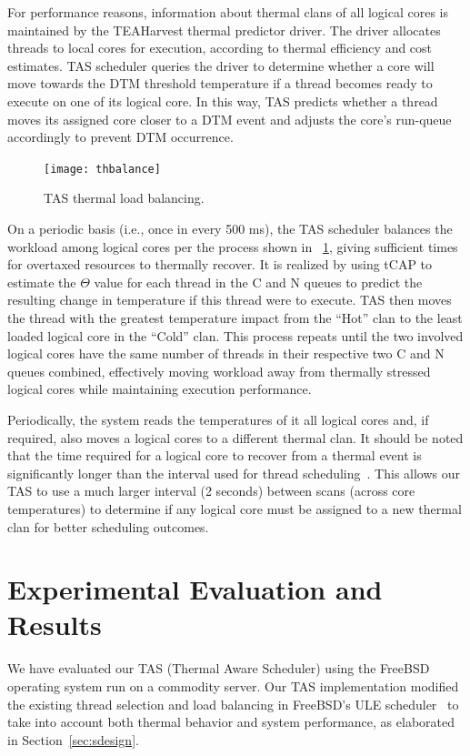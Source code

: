 \documentclass[times, 10pt,twocolumn]{IEEEtran}
\begin{document}
For performance reasons, information about thermal clans of all logical
cores is maintained by the TEAHarvest thermal predictor driver.  The
driver allocates threads to local cores for execution, according to
thermal efficiency and cost estimates.  TAS scheduler queries the driver
to determine whether a core will move towards the DTM threshold
temperature if a thread becomes ready to execute on one of its logical
core.  In this way, TAS predicts whether a thread moves its assigned
core closer to a DTM event and adjusts the core's run-queue accordingly
to prevent DTM occurrence.

\begin{figure}[t]
  \centering
  \texttt{[image: thbalance]}
  \caption{TAS thermal load balancing.}
  \label{fig:tasbalance}
\end{figure}
On a periodic basis (i.e., once in every 500 ms), the TAS scheduler
balances the workload among logical cores per the process shown in
\figurename~\ref{fig:tasbalance}, giving sufficient times for overtaxed
resources to thermally recover.  
It is realized by using tCAP to estimate the $\Theta$ value for each thread 
in the C and N queues
to predict the resulting change in temperature if this thread
were to execute.  TAS then moves the thread with the greatest temperature
impact from the ``Hot'' clan to the least loaded logical core in the ``Cold'' clan. This process repeats until the two involved logical cores
have the same number of threads in their respective two C and N queues combined, 
effectively moving workload away from thermally stressed logical
cores while maintaining execution performance.

Periodically, the system reads the temperatures of it all logical cores
and, if required, also moves a logical cores to a different thermal
clan.  It should be noted that the time required for a logical core to
recover from a thermal event is significantly longer than the interval
used for thread scheduling~\cite{Choi2007}. This allows our TAS to use a
much larger interval (2 seconds) between scans (across core
temperatures) to determine if any logical core must be assigned to a new
thermal clan for better scheduling outcomes.

\section{Experimental Evaluation and Results}
\label{sec:experiment} 
We have evaluated our TAS (Thermal Aware Scheduler) using the FreeBSD
operating system run on a commodity server.  Our TAS implementation
modified the existing thread selection and load balancing in FreeBSD's
ULE scheduler~\cite{McKusick2004} to take into account both thermal
behavior and system performance, as elaborated in
Section~\ref{sec:sdesign}. 
\end{document}
